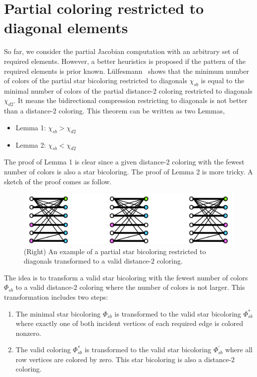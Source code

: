 \documentclass[12pt, twoside,a4paper,toc=bibliography]{scrbook}
\begin{document}
\section{Partial coloring restricted to diagonal elements}
\label{s.part.color.diag}
So far, we consider the partial Jacobian computation with an arbitrary
set of required elements. However, a better heuristics is proposed if the
pattern of the required elements is prior known.
Lülfesmann~\cite{Lulfesmann2012Fap} shows that the minimum number of colors of
the partial star bicoloring restricted to diagonals $\chi_{sb}$ is equal to
the minimal number of colors of the partial distance-$2$ coloring restricted
to diagonals $\chi_{d2}$. It means the bidirectional compression restricting to diagonals is not better than
a distance-$2$ coloring. 
This theorem can be written as two Lemmas,
\begin{itemize}
\item Lemma 1: $\chi_{sb} > \chi_{d2}$
\item Lemma 2: $\chi_{sb} < \chi_{d2}$
\end{itemize}
The proof of Lemma 1 is clear since
a given distance-$2$ coloring with the fewest number of colors is also a star bicoloring.
The proof of Lemma 2 is more tricky. A sketch of the proof comes as follow.
\begin{figure}
\includegraphics[width=\linewidth]{proof1.png}
\caption{
(Right) An example of a partial star bicoloring restricted to diagonals
transformed to a valid distance-$2$ coloring.}
\label{proof1}
\end{figure}


The idea is to transform a valid star bicoloring with the fewest number of colors $\Phi_{sb}$ to 
a valid distance-$2$ coloring where the number of colors is not larger.
This transformation includes two steps:
\begin{enumerate}
\item The minimal star bicoloring $\Phi_{sb}$ is transformed 
to the valid star bicoloring $\Phi_{sb}^{*}$ 
where exactly one of both incident vertices of each required edge is colored nonzero.
\item The valid coloring $\Phi_{sb}^{*}$ is transformed 
to the valid star bicoloring $\Phi_{sb}^{'}$ where all row vertices are colored by zero.
This star bicoloring is also a distance-$2$ coloring.
\end{enumerate}
\end{document}
